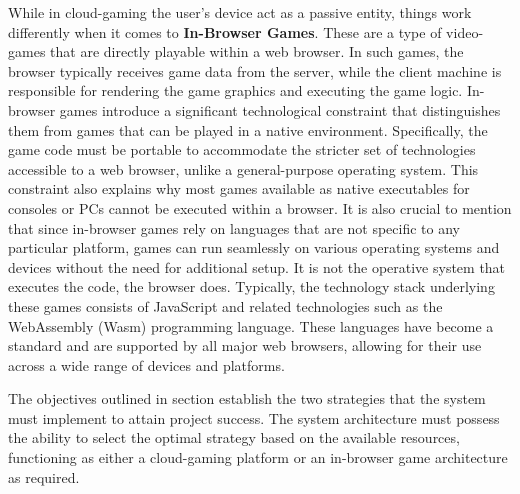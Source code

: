 While in cloud-gaming the user's device act as a passive entity, things work differently when it comes to \textbf{In-Browser Games}. These are a type of video-games that are directly playable within a web browser. In such games, the browser typically receives game data from the server, while the client machine is responsible for rendering the game graphics and executing the game logic.
In-browser games introduce a significant technological constraint that distinguishes them from games that can be played in a native environment. Specifically, the game code must be portable to accommodate the stricter set of technologies accessible to a web browser, unlike a general-purpose operating system.
This constraint also explains why most games available as native executables for consoles or PCs cannot be executed within a browser. It is also crucial to mention that since in-browser games rely on languages that are not specific to any particular platform, games can run seamlessly on various operating systems and devices without the need for additional setup. It is not the operative system that executes the code, the browser does.
Typically, the technology stack underlying these games consists of JavaScript and related technologies such as the WebAssembly (Wasm) programming language. These languages have become a standard and are supported by all major web browsers, allowing for their use across a wide range of devices and platforms.\newline

The objectives outlined in section  establish the two strategies that the system must implement to attain project success. The system architecture must possess the ability to select the optimal strategy based on the available resources, functioning as either a cloud-gaming platform or an in-browser game architecture as required.
